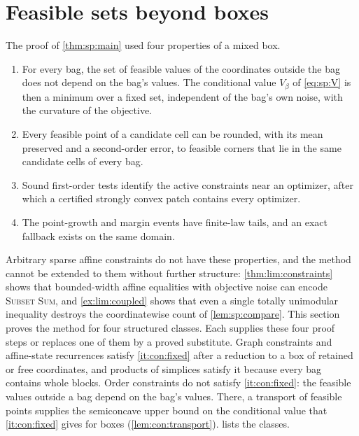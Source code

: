 \section{Feasible sets beyond boxes}\label{sec:con}

The proof of \cref{thm:sp:main} used four properties of a mixed box.
\begin{enumerate}[label=(P\arabic*)]
\item\label{it:con:fixed} For every bag, the set of feasible values of the
coordinates outside the bag does not depend on the bag's values. The
conditional value $V_\beta$ of \eqref{eq:sp:V} is then a minimum over a fixed
set, independent of the bag's own noise, with the curvature of the objective.
\item\label{it:con:round} Every feasible point of a candidate cell can be
rounded, with its mean preserved and a second-order error, to feasible
corners that lie in the same candidate cells of every bag.
\item\label{it:con:close} Sound first-order tests identify the active
constraints near an optimizer, after which a certified strongly convex patch
contains every optimizer.
\item\label{it:con:law} The point-growth and margin events have finite-law
tails, and an exact fallback exists on the same domain.
\end{enumerate}
Arbitrary sparse affine constraints do not have these properties, and the
method cannot be extended to them without further structure:
\cref{thm:lim:constraints} shows that bounded-width affine equalities with
objective noise can encode \textsc{Subset Sum}, and \cref{ex:lim:coupled}
shows that even a single totally unimodular inequality destroys the
coordinatewise count of \cref{lem:sp:compare}. This section proves the
method for four structured classes. Each supplies these four proof steps or
replaces one of them by a proved substitute. Graph constraints and
affine-state recurrences satisfy \ref{it:con:fixed} after a reduction to a
box of retained or free coordinates, and products of simplices satisfy it
because every bag contains whole blocks. Order constraints do not satisfy
\ref{it:con:fixed}: the feasible values outside a bag depend on the bag's
values. There, a transport of feasible points supplies the semiconcave upper
bound on the conditional value that \ref{it:con:fixed} gives for boxes
(\cref{lem:con:transport}).  lists the classes.


